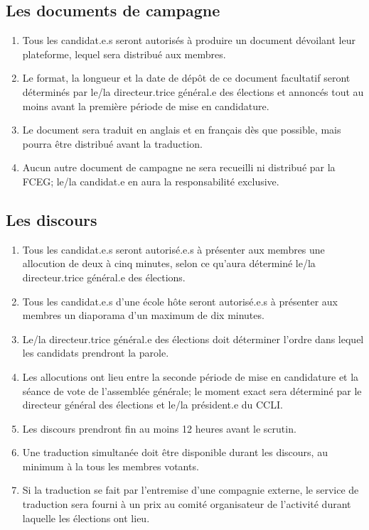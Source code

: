 \subsection{Les documents de campagne}
\label{les-documents-de-campagne}

\begin{enumerate}
 \item
  Tous les candidat.e.s seront autorisés à produire un document dévoilant leur plateforme, lequel sera distribué aux membres.
 \item
  Le format, la longueur et la date de dépôt de ce document facultatif seront déterminés par le/la directeur.trice général.e des élections et annoncés tout au moins avant la première période de mise en candidature.
 \item
  Le document sera traduit en anglais et en français dès que possible, mais pourra être distribué avant la traduction.
 \item
  Aucun autre document de campagne ne sera recueilli ni distribué par la FCEG; le/la candidat.e en aura la responsabilité exclusive.
\end{enumerate}

\subsection{Les discours}
\label{les-discours}

\begin{enumerate}
 \item
  Tous les candidat.e.s seront autorisé.e.s à présenter aux membres une allocution de deux à cinq minutes, selon ce qu'aura déterminé le/la directeur.trice général.e des élections.
 \item
  Tous les candidat.e.s d'une école hôte seront autorisé.e.s à présenter aux membres un diaporama d'un maximum de dix minutes.
 \item
  Le/la directeur.trice général.e des élections doit déterminer l'ordre dans lequel les candidats prendront la parole.
 \item
  Les allocutions ont lieu entre la seconde période de mise en candidature et la séance de vote de l'assemblée générale; le moment exact sera déterminé par le directeur général des élections et le/la président.e du CCLI.
 \item
  Les discours prendront fin au moins 12 heures avant le scrutin.
 \item
  Une traduction simultanée doit être disponible durant les discours, au minimum à la tous les membres votants.
 \item
  Si la traduction se fait par l'entremise d'une compagnie externe, le service de traduction sera fourni à un prix au comité organisateur de l'activité durant laquelle les élections ont lieu.
\end{enumerate}

